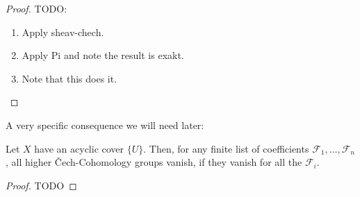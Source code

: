 \begin{proof}
  TODO:
  \begin{enumerate}
  \item Apply sheav-chech.
  \item Apply Pi and note the result is exakt.
  \item Note that this does it.
  \end{enumerate}
\end{proof}

A very specific consequence we will need later:

\begin{corollary}%
  \label{chech-coefficient-sum}
  Let $X$ have an acyclic cover $\{U\}$.
  Then, for any finite list of coefficients $\mathcal F_1,\dots,\mathcal F_n$,
  all higher \v{C}ech-Cohomology groups vanish, if they vanish for all the $\mathcal F_i$.
\end{corollary}

\begin{proof}
  TODO
\end{proof}